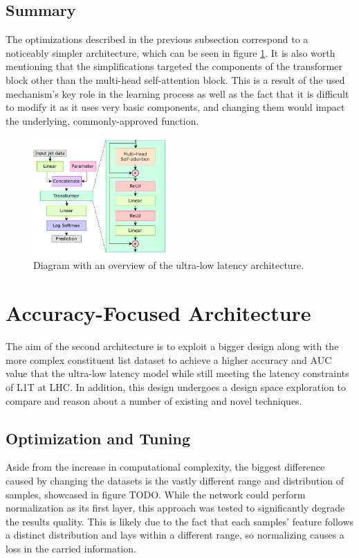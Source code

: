 \subsection{Summary}
The optimizations described in the previous subsection correspond to a noticeably simpler architecture, which can be seen in figure \ref{fig:constituent-net-simplified}. It is also worth mentioning that the simplifications targeted the components of the transformer block other than the multi-head self-attention block. This is a result of the used mechanism's key role in the learning process as well as the fact that it is difficult to modify it as it uses very basic components, and changing them would impact the underlying, commonly-approved function.

\begin{figure}[hpt!]
  \centering
  \includegraphics[trim={0cm 0cm 0cm 0cm}, width=0.45\textwidth, center]{models/constituent_net_simplified.pdf}
  \caption{Diagram with an overview of the ultra-low latency architecture.}
  \label{fig:constituent-net-simplified}
\end{figure}


\section{Accuracy-Focused Architecture}\label{accuracy-focused-model}
The aim of the second architecture is to exploit a bigger design along with the more complex constituent list dataset to achieve a higher accuracy and AUC value that the ultra-low latency model while still meeting the latency constraints of L1T at LHC. In addition, this design undergoes a design space exploration to compare and reason about a number of existing and novel techniques.

\subsection{Optimization and Tuning}
Aside from the increase in computational complexity, the biggest difference caused by changing the datasets is the vastly different range and distribution of samples, showcased in figure TODO. While the network could perform normalization as its first layer, this approach was tested to significantly degrade the results quality. This is likely due to the fact that each samples' feature follows a distinct distribution and lays within a different range, so normalizing causes a loss in the carried information.

